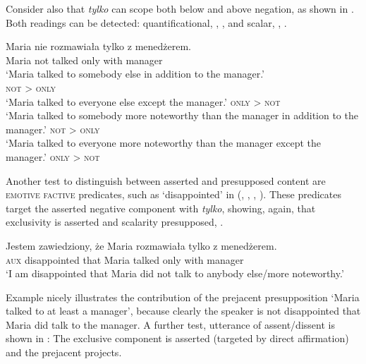 \documentclass[output=paper,colorlinks,citecolor=brown]{langscibook}
\begin{document}
Consider also that \textit{tylko} can scope both below and above negation, as shown in . Both  readings can be detected: quantificational, , , and scalar, , .

\ea\label{ex:tom:29}
\gll Maria nie rozmawiała tylko z       menedżerem.\\
Maria not talked           only with manager\\
\ea\label{ex:tom:29a}
‘Maria talked to somebody else in addition to the manager.’\\\hfill \textsc{not} > \textsc{only}\\
\ex\label{ex:tom:29b}
‘Maria talked to everyone else except the manager.’ \hfill \textsc{only} > \textsc{not}\\
\ex\label{ex:tom:29c}
‘Maria talked to somebody more noteworthy than the manager in addition to the manager.’ \hfill
\textsc{not} > \textsc{only}\\
\ex\label{ex:tom:29d}
‘Maria talked to everyone more noteworthy than the manager except the manager.’ \hfill \textsc{only} > \textsc{not}
\z 
\z 

\noindent Another test to distinguish between asserted and presupposed content are \textsc{emotive factive} predicates, such as `disappointed' in  (\citealt{chierchiamcconnellginet90}, \citealt{beaverclark08}, \citealt{Simons.etal2011}, \citealt{coppockbeaver14}). These predicates target the asserted negative component with \textit{tylko}, showing, again, that exclusivity is asserted and scalarity presupposed, .

\ea\label{ex:tom:30}
\gll Jestem zawiedziony, że Maria rozmawiała tylko z menedżerem.\\
\textsc{aux} disappointed that Maria talked only with manager\\
\glt `I am disappointed that Maria did not talk to anybody else/more noteworthy.’
\z 

\noindent Example  nicely illustrates the contribution of the prejacent presupposition ‘Maria talked to at least a manager’, because clearly the speaker is not disappointed that Maria did talk to the manager. A further test, utterance of assent/dis\-sent \citep{roberts11} is shown in : The exclusive component is asserted (targeted by direct affirmation) and the prejacent projects.
\end{document}
